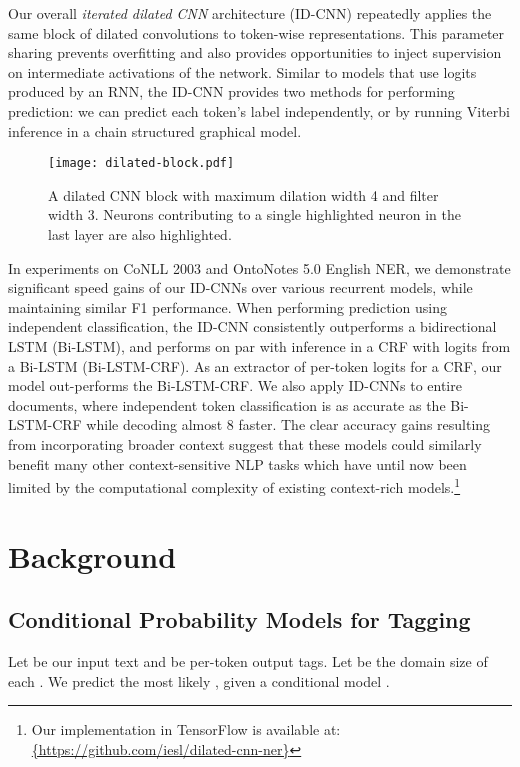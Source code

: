 \documentclass[11pt,letterpaper]{article}
\begin{document}
Our overall \textit{iterated dilated CNN} architecture (ID-CNN) repeatedly applies the same block of dilated convolutions to token-wise representations. This parameter sharing prevents overfitting and also provides opportunities to inject supervision on intermediate activations of the network. Similar to models that use logits produced by an RNN, the ID-CNN provides two methods for performing prediction: we can predict each token's label independently, or by running Viterbi inference in a chain structured graphical model. 

\begin{figure}
\texttt{[image: dilated-block.pdf]}
\caption{A dilated CNN block with maximum dilation width 4 and filter width 3. Neurons contributing to a single highlighted neuron in the last layer are also highlighted. \label{dilated-block-fig}}
\end{figure}

In experiments on CoNLL 2003 and OntoNotes 5.0 English NER, we demonstrate significant speed gains of our ID-CNNs over various recurrent models, while maintaining similar F1 performance. When performing prediction using independent classification, the ID-CNN consistently outperforms a bidirectional LSTM (Bi-LSTM), and performs on par with inference in a CRF with logits from a Bi-LSTM (Bi-LSTM-CRF). As an extractor of per-token logits for a CRF, our model out-performs the Bi-LSTM-CRF. We also apply ID-CNNs to entire documents, where independent token classification is as accurate as the Bi-LSTM-CRF while decoding almost 8 faster. The clear accuracy gains resulting from incorporating broader context suggest that these models could similarly benefit many other context-sensitive NLP tasks which have until now been limited by the computational complexity of existing context-rich models.\footnote{Our implementation in TensorFlow \citep{abadi2015tensorflow} is available at: \url{{https://github.com/iesl/dilated-cnn-ner}}}

 
\section{Background}
\subsection{Conditional Probability Models for Tagging}
\label{sec:prob-model}
Let  be our input text and  be per-token output tags. Let  be the domain size of each . We predict the most likely , given a conditional model . 
\end{document}
